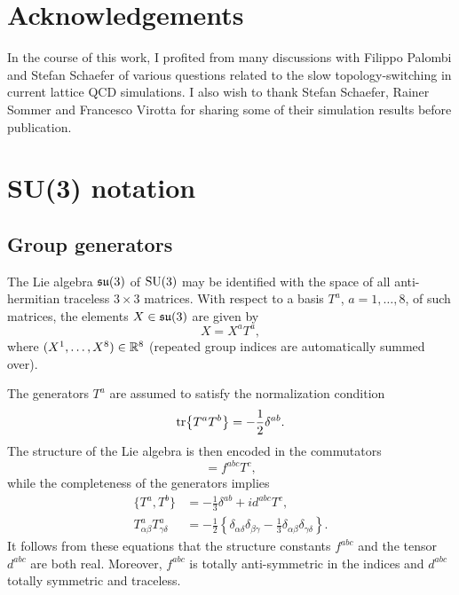 \section*{Acknowledgements}
In the course of this work, I profited from
many discussions with Filippo Palombi and Stefan Schaefer
of various questions related to
the slow topology-switching in current lattice QCD simulations.
I also wish to thank
Stefan Schaefer, Rainer Sommer and Francesco Virotta for
sharing some of their simulation results before publication.

\appendix


\section{SU(3) notation}

\subsection{Group generators}

The Lie algebra $\mathfrak{su}(3)$ of $\mathrm{SU}(3)$
may be identified with the space of all anti-hermitian
traceless $3\times3$ matrices.
With respect to a
basis $T^a$, $a=1,\ldots,8$, of such matrices,
the elements $X\in\mathfrak{su}(3)$ are given by
\begin{equation}
  X=X^aT^a,
\end{equation}
where $(X^1,\ldots,X^8)\in\mathbb{R}^8$
(repeated group indices are automatically summed over).

The generators $T^a$ are assumed to satisfy
the normalization condition
\begin{equation}
  \mathrm{tr}\bigl\{T^aT^b\bigr\}=-\frac{1}{2}\delta^{ab}.
\end{equation}
The structure of the Lie algebra is then encoded in the commutators
\begin{equation}
  [T^a,T^b]=f^{abc}T^c,
\end{equation}
while the completeness of the generators implies
\begin{align}
  \bigl\{T^a,T^b\bigr\}&=-\frac{1}{3}\delta^{ab}+id^{abc}T^c,
  \\[1.0ex]
  T^a_{\alpha\beta}T^a_{\gamma\delta}&=
  -\frac{1}{2}\left\{
  \delta_{\alpha\delta}\delta_{\beta\gamma}-\frac{1}{3}\delta_{\alpha\beta}
  \delta_{\gamma\delta}\right\}.
\end{align}
It follows from these equations that the structure constants
$f^{abc}$ and the tensor $d^{abc}$ are both real.
Moreover, $f^{abc}$
is totally anti-symmetric in the indices and $d^{abc}$ totally symmetric
and traceless.


